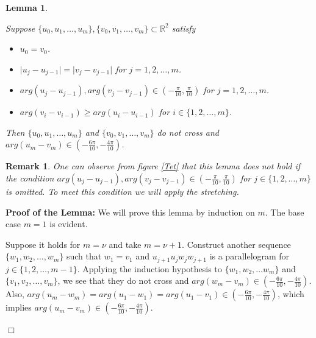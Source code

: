 \documentclass[openright, 12pt]{article}
\newtheorem{lema}[teorema]{Lemma}
\newtheorem{rem}[teorema]{Remark}
\newcommand{\field}[1]{\ensuremath{\mathbb{#1}}}
\newcommand{\R}{\field{R}}
\begin{document}
\begin{lema} \label{Ant}
{\rm Suppose $\{ u_0, u_1, \ldots , u_m     \}, \{ v_0, v_1, \ldots , v_m      \} \subset \R^2$ satisfy
\begin{itemize}
\item $u_0 = v_0$.
\item $\vert u_j - u_{j-1} \vert = \vert v_j - v_{j-1}  \vert$ for $j=1,2, \ldots, m$.
\item $arg(u_{j }- u_{j-1}), arg(v_j - v_{j-1} )  \in \left( -\frac{\pi}{10},\frac{\pi}{10} \right)$ for $j = 1, 2, \ldots , m$.
\item $arg (v_{i} - v_{i-1} )\geq arg (u_{i} - u_{i-1})$ for $i \in \{ 1, 2, \ldots, m \} $.
\end{itemize}

Then $\{ u_0, u_1, \ldots , u_m     \}$ and $ \{ v_0, v_1, \ldots , v_m      \}$ do not cross and  \\
$arg(u_m - v_m) \in \left( - \frac{6 \pi}{10} , -\frac{4\pi}{10}  \right)$.
}
\end{lema}



\begin{rem}
{\rm One can observe from figure \ref{Tet} that this lemma does not hold if the condition $arg(u_{j }- u_{j-1}), arg(v_j - v_{j-1} )  \in \left( -\frac{\pi}{10},\frac{\pi}{10} \right)$ for $j \in \{ 1, 2, \ldots , m\} $ is omitted. 
To meet this condition we will apply the stretching. 
}
\end{rem}




\textbf{Proof of the Lemma:}
We will prove this lemma by induction on $m$.
The base case $m=1$ is evident.


Suppose it holds for $m=\nu$ and take $m = \nu +1$. Construct another sequence $\{ w_1, w_2, \ldots, w_m   \}$ such that $w_1 = v_1$ and $u_{j+1}u_jw_jw_{j+1} $ is a parallelogram for $j \in \{ 1, 2, \ldots , m-1\} $. Applying the induction hypothesis to $\{ w_1, w_2, \ldots w_m   \}$ and $\{v_1, v_2, \ldots, v_m  \}$, we see that they do not cross and $arg( w_{m} - v_m) \in \left( - \frac{6 \pi}{10} , -\frac{4\pi}{10}  \right)$. Also, $arg(u_m - w_m )= arg (u_1 - w_1) = arg (u_1 - v_1) \in \left( - \frac{6 \pi}{10} , -\frac{4\pi}{10}  \right)$, which implies $arg(u_m - v_m)\in \left( - \frac{6 \pi}{10} , -\frac{4\pi}{10}  \right)$.

\hfill $\Box$
\end{document}
